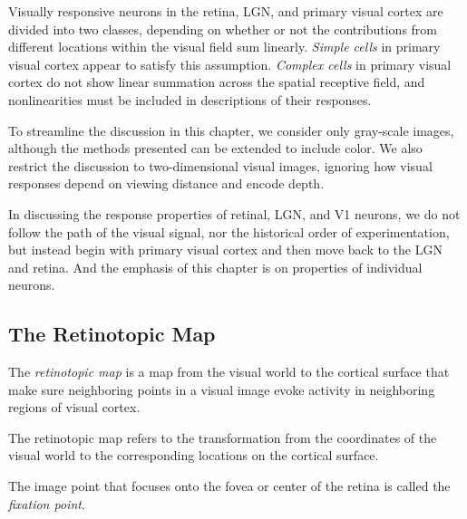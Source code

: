 \begin{ntn}
  \label{simpleComplexCells}
  Visually responsive neurons in the retina, LGN, and primary visual cortex are divided into two classes, depending on whether or not the contributions from different locations within the visual field sum linearly. \emph{Simple cells} in primary visual cortex appear to satisfy this assumption. \emph{Complex cells} in primary visual cortex do not show linear summation across the spatial receptive field, and nonlinearities must be included in descriptions of their responses.
\end{ntn}

\begin{asm}
  \label{asm:light}
  To streamline the discussion in this chapter, we consider only gray-scale images, although the methods presented can be extended to include color. We also restrict the discussion to two-dimensional visual images, ignoring how visual responses depend on viewing distance and encode depth.
\end{asm}

\begin{rem}
  In discussing the response properties of retinal, LGN, and V1 neurons, we do not follow the path of the visual signal, nor the historical order of experimentation, but instead begin with primary visual cortex and then move back to the LGN and retina. And the emphasis of this chapter is on properties of individual neurons.
\end{rem}

\subsection{The Retinotopic Map}
\label{sec:retinotopicMap}
\begin{defn}
  \label{def:retinotopicMap}
  The \emph{retinotopic map} is a map from the visual world to the cortical surface that make sure neighboring points in a visual image evoke activity in neighboring regions of visual cortex. 
\end{defn}

\begin{rem}
  The retinotopic map refers to the transformation from the coordinates of the visual world to the corresponding locations on the cortical surface.
\end{rem}

\begin{ntn}
  \label{fixationPoint}
  The image point that focuses onto the fovea or center of the retina is called the \emph{fixation point}.
\end{ntn}

